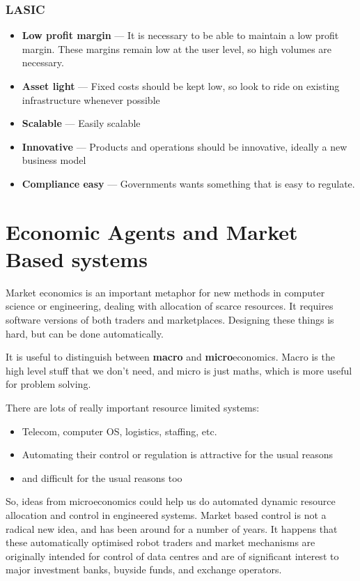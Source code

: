 \documentclass[11pt,a4paper,titlepage,dvipsnames,cmyk]{scrartcl}
\begin{document}
\subsubsection{LASIC}
\begin{itemize}
    \item \textbf{Low profit margin} --- It is necessary to be able to maintain a low profit margin. These margins remain low at the user level, so high volumes are necessary.
    \item \textbf{Asset light} --- Fixed costs should be kept low, so look to ride on existing infrastructure whenever possible
    \item \textbf{Scalable} --- Easily scalable
    \item \textbf{Innovative} --- Products and operations should be innovative, ideally a new business model
    \item \textbf{Compliance easy} --- Governments wants something that is easy to regulate.
\end{itemize}

\section{Economic Agents and Market Based systems}
Market economics is an important metaphor for new methods in computer science or engineering, dealing with allocation of scarce resources. It requires software versions of both traders and marketplaces. Designing these things is hard, but can be done automatically. 

It is useful to distinguish between \textbf{macro} and \textbf{micro}economics. Macro is the high level stuff that we don't need, and micro is just maths, which is more useful for problem solving.

There are lots of really important resource limited systems:
\begin{itemize}
    \item Telecom, computer OS, logistics, staffing, etc.
    \item Automating their control or regulation is attractive for the usual reasons
    \item and difficult for the usual reasons too
\end{itemize}

So, ideas from microeconomics could help us do automated dynamic resource allocation and control in engineered systems. Market based control is not a radical new idea, and has been around for a number of years. It happens that these automatically optimised robot traders and market mechanisms are originally intended for control of data centres and are of significant interest to major investment banks, buyside funds, and exchange operators.
\end{document}

